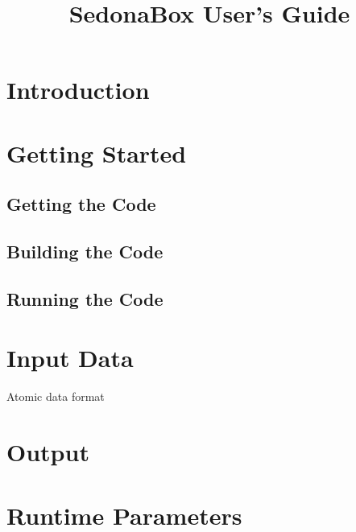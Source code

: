 \documentclass[11pt,letterpaper]{article}
\begin{document}
\title{SedonaBox User's Guide}
\maketitle

\section{Introduction}

\section{Getting Started}

\subsection{Getting the Code}

\subsection{Building the Code}


\subsection{Running the Code}





\section{Input Data}

Atomic data format

\section{Output}

\section{Runtime Parameters}
\end{document}
